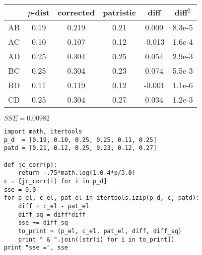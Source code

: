 \documentclass[landscape]{foils}
\begin{document}
\pagecolor{white}


\begin{table}[htdp]
\begin{center}
\begin{tabular}{|c|c|c|c|c|c|}
\hline 
 & $p$-dist & corrected & patristic & diff & diff$^2$  \\ 
\hline 
AB & 0.19 & 0.219 & 0.21 & 0.009  & 8.3e-5 \\
AC & 0.10 & 0.107 & 0.12 & -0.013 & 1.6e-4 \\
AD & 0.25 & 0.304 & 0.25 & 0.054 & 2.9e-3 \\
BC & 0.25 & 0.304 & 0.23 & 0.074 & 5.5e-3 \\
BD & 0.11 & 0.119 & 0.12 & -0.001 & 1.1e-6 \\
CD & 0.25 & 0.304 & 0.27 & 0.034 & 1.2e-3 \\
\hline 
\end{tabular}
\end{center}
\end{table}
$SSE = 0.00982$
\tiny
\begin{verbatim}
import math, itertools
p_d  = [0.19, 0.10, 0.25, 0.25, 0.11, 0.25]
patd = [0.21, 0.12, 0.25, 0.23, 0.12, 0.27]

def jc_corr(p):
    return -.75*math.log(1.0-4*p/3.0)
c = [jc_corr(i) for i in p_d]
sse = 0.0
for p_el, c_el, pat_el in itertools.izip(p_d, c, patd):
    diff = c_el - pat_el
    diff_sq = diff*diff
    sse += diff_sq
    to_print = (p_el, c_el, pat_el, diff, diff_sq)
    print " & ".join([str(i) for i in to_print])
print "sse =", sse 
\end{verbatim}
\end{document}
